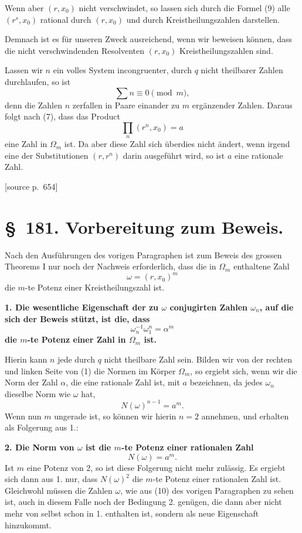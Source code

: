 \documentclass[11pt]{article}
\newcommand{\srcpage}[1]{\par\medskip\noindent\textsf{[source p.~#1]}\par\smallskip}
\begin{document}
Wenn aber $(r,x_0)$ nicht verschwindet, so lassen sich durch die Formel (9) alle $(r^s,x_0)$ rational durch $(r,x_0)$ und durch Kreistheilungszahlen darstellen.

Demnach ist es für unseren Zweck ausreichend, wenn wir beweisen können, dass die nicht verschwindenden Resolventen $(r,x_0)$ Kreistheilungszahlen sind.

Lassen wir $n$ ein volles System incongruenter, durch $q$ nicht theilbarer Zahlen durchlaufen, so ist
\[
  \sum n\equiv0\pmod m,
\]
denn die Zahlen $n$ zerfallen in Paare einander zu $m$ ergänzender Zahlen. Daraus folgt nach (7), dass das Product
\begin{equation}
  \prod_n (r^n,x_0)=a
\tag{10}
\end{equation}
eine Zahl in $\Omega_m$ ist. Da aber diese Zahl sich überdies nicht ändert, wenn irgend eine der Substitutionen $(r,r^n)$ darin ausgeführt wird, so ist $a$ eine rationale Zahl.

\srcpage{654}
\section*{\S~181. Vorbereitung zum Beweis.}

Nach den Ausführungen des vorigen Paragraphen ist zum Beweis des grossen Theorems I nur noch der Nachweis erforderlich, dass die in $\Omega_m$ enthaltene Zahl
\[
  \omega=(r,x_0)^m
\]
die $m$-te Potenz einer Kreistheilungszahl ist.

\textbf{1. Die wesentliche Eigenschaft der zu $\omega$ conjugirten Zahlen $\omega_n$, auf die sich der Beweis stützt, ist die, dass}
\begin{equation}
  \omega_n^{-1}\omega_1^n=\alpha^m
\tag{1}
\end{equation}
\textbf{die $m$-te Potenz einer Zahl in $\Omega_m$ ist.}

Hierin kann $n$ jede durch $q$ nicht theilbare Zahl sein. Bilden wir von der rechten und linken Seite von (1) die Normen im Körper $\Omega_m$, so ergiebt sich, wenn wir die Norm der Zahl $\alpha$, die eine rationale Zahl ist, mit $a$ bezeichnen, da jedes $\omega_n$ dieselbe Norm wie $\omega$ hat,
\[
  N(\omega)^{n-1}=a^m.
\]
Wenn nun $m$ ungerade ist, so können wir hierin $n=2$ annehmen, und erhalten als Folgerung aus 1.:

\textbf{2. Die Norm von $\omega$ ist die $m$-te Potenz einer rationalen Zahl}
\begin{equation}
  N(\omega)=a^m.
\tag{2}
\end{equation}
Ist $m$ eine Potenz von 2, so ist diese Folgerung nicht mehr zulässig. Es ergiebt sich dann aus 1. nur, dass $N(\omega)^2$ die $m$-te Potenz einer rationalen Zahl ist. Gleichwohl müssen die Zahlen $\omega$, wie aus (10) des vorigen Paragraphen zu sehen ist, auch in diesem Falle noch der Bedingung 2. genügen, die dann aber nicht mehr von selbst schon in 1. enthalten ist, sondern als neue Eigenschaft hinzukommt.
\end{document}
